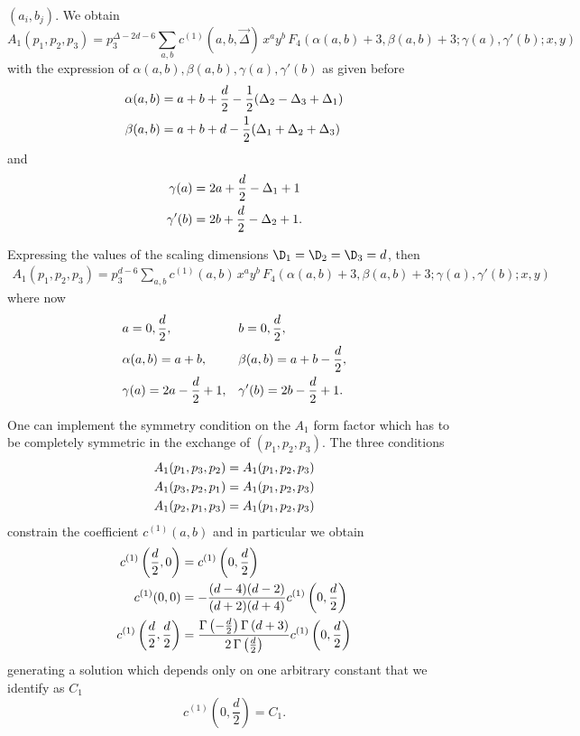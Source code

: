 \documentclass[a4paper,11pt,openright,twoside]{book}
\numberwithin{equation}{section}
\begin{document}
{{$(a_i, b_j)$. We obtain 
\begin{equation}
\label{A1}
A_1(p_1,p_2,p_3)=p_3^{\Delta-2 d - 6}\sum_{a,b} c^{(1)}(a,b,\vec{\Delta})\,x^a y^b \,F_4(\alpha(a,b) +3, \beta(a,b)+3; \gamma(a), \gamma'(b); x, y) 
\end{equation}
with the expression of $\alpha(a,b),\beta(a,b), \gamma(a), \gamma'(b)$ as given before
\begin{align}
\label{cons1}
\alpha(a,b)&= a + b + \frac{d}{2} -\frac{1}{2}(\Delta_2 - \Delta_3 +\Delta_1) \notag\\
\beta(a,b)&= a + b + d -\frac{1}{2}(\Delta_1 + \Delta_2 +\Delta_3) 
\end{align}
and 
\begin{align} 
\label{cons2}
\gamma(a)& =2 a +\frac{d}{2} -\Delta_1 + 1 \notag\\
\gamma'(b)&=2 b +\frac{d}{2} -\Delta_2 + 1 .
\end{align}

Expressing the values of the scaling dimensions $\D_1=\D_2=\D_3=d$, then 
\begin{align}
A_1(p_1,p_2,p_3)=p_3^{d - 6}\sum_{a,b} c^{(1)}(a,b)\,x^a y^b \,F_4(\alpha(a,b) +3, \beta(a,b)+3; \gamma(a), \gamma'(b); x, y) 
\end{align}
where now
\begin{align}
&a=0,\frac{d}{2}, &&b=0,\frac{d}{2},\notag\\
&	\alpha(a,b)= a + b,&&\beta(a,b)= a + b -\frac{d}{2},\notag\\
&\gamma(a) =2 a -\frac{d}{2} + 1,&&\gamma'(b)=2 b -\frac{d}{2}+ 1.
\end{align}

One can implement the symmetry condition on the $A_1$ form factor which has to be completely symmetric in the exchange of $(p_1,p_2,p_3)$. The three conditions 
\begin{align}
A_1(p_1,p_3,p_2)&=A_1(p_1,p_2,p_3)\notag\\
A_1(p_3,p_2,p_1)&=A_1(p_1,p_2,p_3)\notag\\
A_1(p_2,p_1,p_3)&=A_1(p_1,p_2,p_3)
\end{align}
constrain the coefficient $c^{(1)}(a,b)$ and in particular we obtain
\begin{align}
c^{(1)}\left(\frac{d}{2},0\right)&=c^{(1)}\left(0,\frac{d}{2}\right)\notag\\
c^{(1)}(0,0)&=-\frac{(d-4) (d-2)}{(d+2) (d+4)}c^{(1)}\left(0,\frac{d}{2}\right)\notag\\
c^{(1)}\left(\frac{d}{2},\frac{d}{2}\right)&=\frac{\Gamma\left(-\frac{d}{2}\right)\Gamma\left(d+3\right)}{2\,\Gamma\left(\frac{d}{2}\right)} c^{(1)}\left(0,\frac{d}{2}\right)\label{CondA1}
\end{align}
generating a solution which depends only on one arbitrary constant that we identify as $C_1$ 
\begin{equation}
c^{(1)}\left(0,\frac{d}{2}\right)=C_1.\label{oneconst}
\end{equation}
}}
\end{document}
